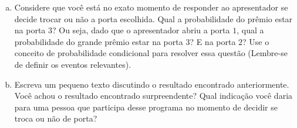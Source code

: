 \documentclass[12pt]{article}
\begin{document}
\begin{enumerate}[a)]
    \item Considere que você está no exato momento de responder ao apresentador se decide trocar ou não a porta escolhida. Qual a probabilidade do prêmio estar na porta $3$?
    Ou seja, dado que o apresentador abriu a porta $1$, qual a probabilidade do grande prêmio estar na porta $3$? E na porta $2$? Use o conceito de probabilidade condicional para resolver 
    essa questão (Lembre-se de definir os eventos relevantes). 
    \item Escreva um pequeno texto discutindo o resultado encontrado anteriormente. Você achou o resultado encontrado surpreendente? Qual indicação você daria para uma pessoa que participa desse programa no momento de decidir se troca ou não de porta?
\end{enumerate}








\end{document}
